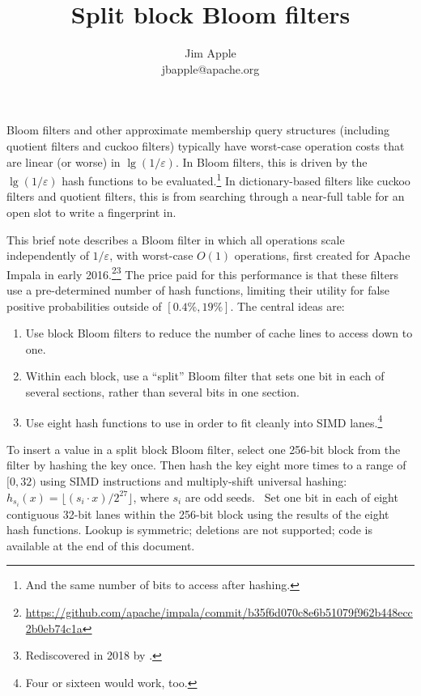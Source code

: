 \documentclass[letterpaper, 11pt]{article}
\begin{document}
\title{Split block Bloom filters}
\author{Jim Apple \\
  jbapple@apache.org}
\maketitle
\thispagestyle{empty}

Bloom filters and other approximate membership query structures (including quotient filters and cuckoo filters) typically have worst-case operation costs that are linear (or worse) in $\lg (1/\varepsilon)$. \cite{cuckoo-filter,quotient-filter}
In Bloom filters, this is driven by the $\lg (1/\varepsilon)$ hash functions to be evaluated.\footnote{And the same number of bits to access after hashing.}
In dictionary-based filters like cuckoo filters and quotient filters, this is from searching through a near-full table for an open slot to write a fingerprint in.

This brief note describes a Bloom filter in which all operations scale independently of $1/\varepsilon$, with worst-case $O(1)$ operations, first created for Apache Impala in early 2016.\footnote{\url{https://github.com/apache/impala/commit/b35f6d070c8e6b51079f962b448ecc2b0eb74c1a}}\footnote{Rediscovered in 2018 by \cite{ultra-fast}.}
The price paid for this performance is that these filters use a pre-determined number of hash functions, limiting their utility for false positive probabilities outside of $[0.4\%, 19\%]$.
The central ideas are:

\begin{enumerate}
\item Use block Bloom filters to reduce the number of cache lines to access down to one.~\cite{block}
\item Within each block, use a ``split'' Bloom filter that sets one bit in each of several sections, rather than several bits in one section.~\cite{split-bloom}
\item Use eight hash functions to use in order to fit cleanly into SIMD lanes.\footnote{Four or sixteen would work, too.}
\end{enumerate}

To insert a value in a split block Bloom filter, select one 256-bit block from the filter by hashing the key once.
Then hash the key eight more times to a range of $[0,32)$ using SIMD instructions and multiply-shift universal hashing: $h_{s_i}(x) = \lfloor(s_i \cdot x) / 2^{27}\rfloor$, where $s_i$ are odd seeds.~\cite{multiply-shift}
Set one bit in each of eight contiguous 32-bit lanes within the 256-bit block using the results of the eight hash functions.
Lookup is symmetric; deletions are not supported; code is available at the end of this document.
\end{document}
